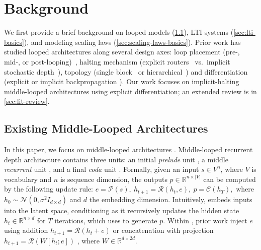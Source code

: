 \section{Background}
\label{sec:background}

We first provide a brief background on looped models (\cref{sec:rdm-basics}), LTI systems (\cref{sec:lti-basics}), and modeling scaling laws (\cref{sec:scaling-laws-basics}).
Prior work has studied looped architectures along several design axes: loop placement (pre-, mid-, or post-looping)~\citep{saunshiReasoningLatentThoughts2025b}, halting mechanism (explicit
routers~\citep{baeMixtureofRecursionsLearningDynamic2025, zhuScalingLatentReasoning2025} vs.\
implicit stochastic depth~\citep{geiping_scaling_2025,
mcleish_retrofitted_recurrence}), topology (single
block~\citep{geiping_scaling_2025} or hierarchical~\citep{wangHierarchicalReasoningModel2025b,jolicoeur-martineauLessMoreRecursive2025}) and differentiation (explicit or implicit backpropagation \cite{bai2019deepequilibriummodels}). Our work focuses on implicit-halting middle-looped architectures using explicit differentiation; an extended review is in \cref{sec:lit-review}.

\subsection{Existing Middle-Looped Architectures}
\label{sec:rdm-basics}

In this paper, we focus on middle-looped architectures \citep{saunshiReasoningLatentThoughts2025b,geiping_scaling_2025}.
Middle-looped recurrent depth architecture contains three units: an initial \textit{prelude} unit \prelude, a middle \textit{recurrent} unit \recurrent, and a final \textit{coda} unit \coda. Formally, given an input $s \in V^n$, where $V$ is vocabulary and $n$ is sequence dimension, the outputs $p \in \mathbb{R}^{n \times |V|}$ can be computed by the following update rule:
$e = \mathcal{P}(s),~h_{t+1} = \mathcal{R}(h_t, e),~p = \mathcal{C}(h_T),$
where $h_0 \sim \mathcal{N}(0, \sigma^2 I_{d\times d})$ and $d$ the embedding dimension.
Intuitively, \prelude embeds inputs into the latent space, conditioning \recurrent as it recursively updates the hidden state $h_t \in \mathbb{R}^{n \times d}$ for $T$ iterations,
which \coda uses to generate $p$. Within \recurrent, prior work inject $e$ using addition $h_{t+1} = \mathcal{R}(h_t + e)$ \citep{yangLoopedTransformersAre2023} or concatenation with projection $h_{t+1} = \mathcal{R}(W[h_t; e])$ \citep{geiping_scaling_2025}, where $W \in \mathbb{R}^{d \times 2d}$. 

